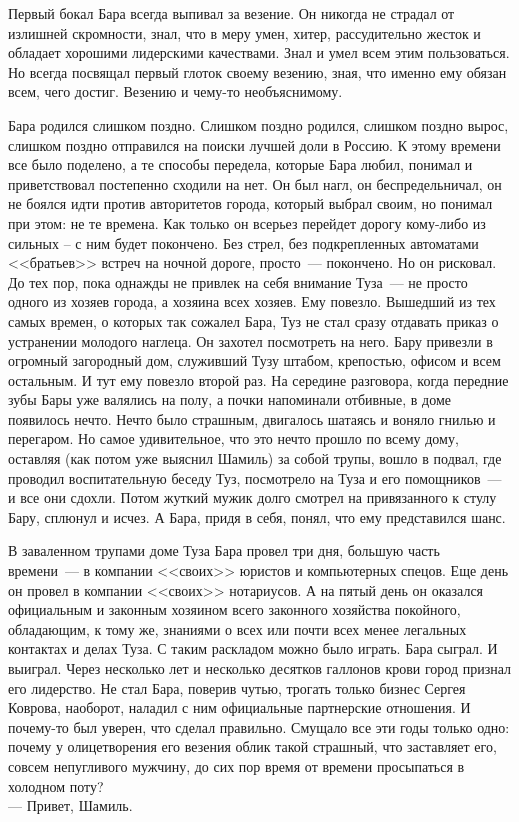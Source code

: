Первый бокал Бара всегда выпивал за везение. Он никогда не страдал от излишней 
скромности, знал, что в меру умен, хитер, рассудительно жесток и обладает 
хорошими лидерскими качествами. Знал и умел всем этим пользоваться. Но всегда 
посвящал первый глоток своему везению, зная, что именно ему обязан всем, чего 
достиг. Везению и чему-то необъяснимому.

Бара родился слишком поздно. Слишком поздно родился, слишком поздно вырос, 
слишком поздно отправился на поиски лучшей доли в Россию. К этому времени все 
было поделено, а те способы передела, которые Бара любил, понимал и 
приветствовал постепенно сходили на нет. Он был нагл, он беспредельничал, он не 
боялся идти против авторитетов города, который выбрал своим, но понимал при 
этом: не те времена. Как только он всерьез перейдет дорогу кому-либо из сильных 
– с ним будет покончено. Без стрел, без подкрепленных автоматами <<братьев>> 
встреч на ночной дороге, просто~--- покончено. Но он рисковал. До тех пор, пока 
однажды не привлек на себя внимание Туза~--- не просто одного из хозяев города, 
а хозяина всех хозяев. Ему повезло. Вышедший из тех самых времен, о которых так 
сожалел Бара, Туз не стал сразу отдавать приказ о устранении молодого наглеца. 
Он захотел посмотреть на него. Бару привезли в огромный загородный дом, 
служивший Тузу штабом, крепостью, офисом и всем остальным. И тут ему повезло 
второй раз. На середине разговора, когда передние зубы Бары уже валялись на 
полу, а почки напоминали отбивные, в доме появилось нечто. Нечто было страшным, 
двигалось шатаясь и воняло гнилью и перегаром. Но самое удивительное, что это 
нечто прошло по всему дому, оставляя (как потом уже выяснил Шамиль) за собой 
трупы, вошло в подвал, где проводил воспитательную беседу Туз, посмотрело на 
Туза и его помощников~--- и все они сдохли. Потом жуткий мужик долго смотрел на 
привязанного к стулу Бару, сплюнул и исчез. А Бара, придя в себя, понял, что 
ему представился шанс.

В заваленном трупами доме Туза Бара провел три дня, большую часть времени~--- в 
компании <<своих>> юристов и компьютерных спецов. Еще день он провел в компании 
<<своих>> нотариусов. А на пятый день он оказался официальным и законным 
хозяином всего законного хозяйства покойного, обладающим, к тому же, знаниями о всех или 
почти всех менее легальных контактах и делах Туза. С таким раскладом можно было 
играть. Бара сыграл. И выиграл. Через несколько лет и несколько десятков 
галлонов крови город признал его лидерство. Не стал Бара, поверив чутью, 
трогать только бизнес Сергея Коврова, наоборот, наладил с ним официальные партнерские 
отношения. И почему-то был уверен, что сделал правильно. Смущало все эти годы 
только одно: почему у олицетворения его везения облик такой страшный, что 
заставляет его, совсем непугливого мужчину, до сих пор время от времени 
просыпаться в холодном поту?\\
--- Привет, Шамиль.



